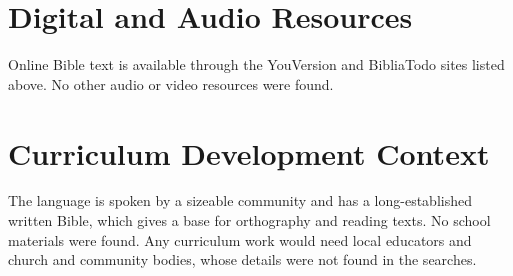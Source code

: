 \documentclass[12pt]{article}
\begin{document}
\section{Digital and Audio Resources}
Online Bible text is available through the YouVersion and BibliaTodo sites listed above. No other audio or video resources were found.

\section{Curriculum Development Context}
The language is spoken by a sizeable community and has a long-established written Bible, which gives a base for orthography and reading texts. No school materials were found. Any curriculum work would need local educators and church and community bodies, whose details were not found in the searches.
\end{document}
